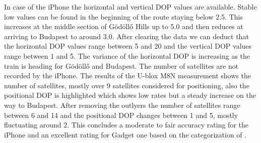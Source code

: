 \documentclass{article}
\begin{document}
			In case of the iPhone the horizontal and vertical DOP values are available. Stable low values can be found in the beginning of the route staying below 2.5. This increases at the middle section of Gödöllő Hills up to 5.0 and then reduces at arriving to Budapest to around 3.0. After clearing the data we can deduct that the horizontal DOP values range between 5 and 20 and the vertical DOP values range between 1 and 5. The variance of the horizontal DOP is increasing as the train is heading for Gödöllő and Budapest. The number of satellites are not recorded by the iPhone. The results of the U-blox M8N measurement shows the number of satellites, mostly over 9 satellites considered for positioning, also the positional DOP is highlighted which shows low rates but a steady increase on the way to Budapest. After removing the outlyers the number of satellites range between 6 and 14 and the positional DOP changes between 1 and 5, mostly fluctuating around 2. This concludes a moderate to fair accuracy rating for the iPhone and an excellent rating for Gadget one based on the categorization of \cite{tahsinAnalysisDOPIts2015}.
\end{document}
